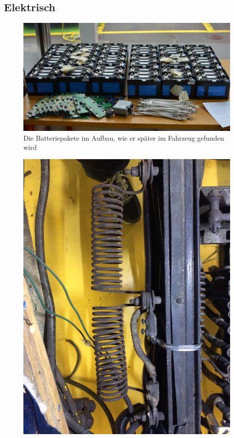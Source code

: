 \begin{landscape}\section{Elektrisch}

\begin{figure}[h]
	\centering
		\includegraphics[width=1.3\textwidth]{images/Anhang/Batteriepakete.jpg}
	\caption{Die Batteriepakete im Aufbau, wie er später im Fahrzeug gefunden wird}
	\label{fig:Batteriepakete}
\end{figure}
\begin{figure}[h]
	\centering
		\includegraphics[angle=180,width=1.30\textwidth]{images/Anhang/Anfahrwiderstand.jpg}

\end{figure}
\end{landscape}

